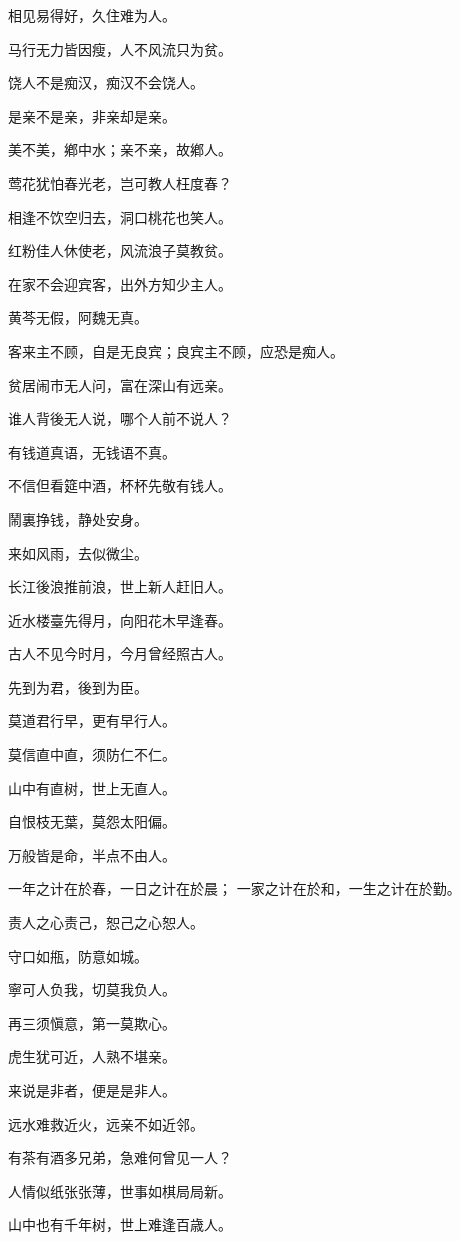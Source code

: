 \documentclass[12pt,oneside]{book}
\begin{document}
相见易得好，久住难为人。

马行无力皆因瘦，人不风流只为贫。

饶人不是痴汉，痴汉不会饶人。

是亲不是亲，非亲却是亲。

美不美，鄕中水；亲不亲，故鄕人。

莺花犹怕春光老，岂可教人枉度春？

相逢不饮空归去，洞口桃花也笑人。

红粉佳人休使老，风流浪子莫教贫。

在家不会迎宾客，出外方知少主人。

黄芩无假，阿魏无真。

客来主不顾，自是无良宾；良宾主不顾，应恐是痴人。

贫居闹市无人问，富在深山有远亲。

谁人背後无人说，哪个人前不说人？

有钱道真语，无钱语不真。

不信但看筵中酒，杯杯先敬有钱人。

鬧裏挣钱，静处安身。

来如风雨，去似微尘。

长江後浪推前浪，世上新人赶旧人。

近水楼臺先得月，向阳花木早逢春。

古人不见今时月，今月曾经照古人。

先到为君，後到为臣。

莫道君行早，更有早行人。

莫信直中直，须防仁不仁。

山中有直树，世上无直人。

自恨枝无葉，莫怨太阳偏。

万般皆是命，半点不由人。

一年之计在於春，一日之计在於晨；
一家之计在於和，一生之计在於勤。

责人之心责己，恕己之心恕人。

守口如甁，防意如城。

寧可人负我，切莫我负人。

再三须愼意，第一莫欺心。

虎生犹可近，人熟不堪亲。

来说是非者，便是是非人。

远水难救近火，远亲不如近邻。

有茶有酒多兄弟，急难何曾见一人？

人情似纸张张薄，世事如棋局局新。

山中也有千年树，世上难逢百歳人。
\end{document}
